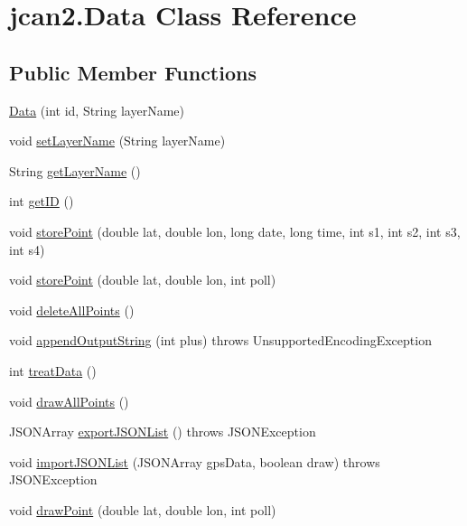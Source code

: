 \hypertarget{classjcan2_1_1_data}{}\section{jcan2.\+Data Class Reference}
\label{classjcan2_1_1_data}
\subsection*{Public Member Functions}
\begin{DoxyCompactItemize}
\item 
\hyperlink{classjcan2_1_1_data_a65cea6bbdb428362e9e26ee0f1c014bc}{Data} (int id, String layer\+Name)
\item 
void \hyperlink{classjcan2_1_1_data_a68b0efe3c51afa149124d1013f4e80d5}{set\+Layer\+Name} (String layer\+Name)
\item 
String \hyperlink{classjcan2_1_1_data_a256dfb10ac552c7aeb30d3da55d90ee3}{get\+Layer\+Name} ()
\item 
int \hyperlink{classjcan2_1_1_data_ac01b895f3f98273d490b38a7c76d51c7}{get\+I\+D} ()
\item 
void \hyperlink{classjcan2_1_1_data_ab2d814a20d964fafc18e322961e7502d}{store\+Point} (double lat, double lon, long date, long time, int s1, int s2, int s3, int s4)
\item 
void \hyperlink{classjcan2_1_1_data_a6fe5e1c788eb8092018347b0209fe5e4}{store\+Point} (double lat, double lon, int poll)
\item 
void \hyperlink{classjcan2_1_1_data_a7fb36e5bea2f3d995499f8388bb2ac64}{delete\+All\+Points} ()
\item 
void \hyperlink{classjcan2_1_1_data_a6a4004a26deb804d261a5e1fd1db26ac}{append\+Output\+String} (int plus)  throws Unsupported\+Encoding\+Exception
\item 
int \hyperlink{classjcan2_1_1_data_a46f0b60ede6b52333a244f6b64f1df79}{treat\+Data} ()
\item 
void \hyperlink{classjcan2_1_1_data_a8d835c101043bf5909332394396126fa}{draw\+All\+Points} ()
\item 
J\+S\+O\+N\+Array \hyperlink{classjcan2_1_1_data_a435acb4d355b91d42b0b2b7ced348e8d}{export\+J\+S\+O\+N\+List} ()  throws J\+S\+O\+N\+Exception
\item 
void \hyperlink{classjcan2_1_1_data_ad5b7045b7e2e9d4a1bbc1b324615e90f}{import\+J\+S\+O\+N\+List} (J\+S\+O\+N\+Array gps\+Data, boolean draw)  throws J\+S\+O\+N\+Exception
\item 
void \hyperlink{classjcan2_1_1_data_a00017ed648a26ffe91daa3d43b9e9452}{draw\+Point} (double lat, double lon, int poll)

\end{DoxyCompactItemize}
